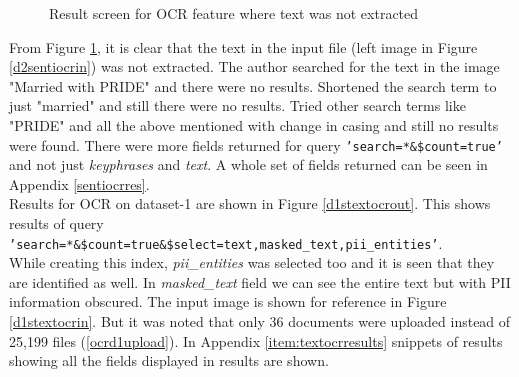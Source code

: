 \begin{itemize}
\begin {figure}[h!h]
        \caption{Result screen for \acs{OCR} feature where text was not extracted}
        \label{d2sentiocrout2}
    \end {figure}
   \newpage
   From Figure \ref{d2sentiocrout2}, it is clear that the text in the input file (left image in Figure \ref{d2sentiocrin}) was not extracted. The author searched for the text in the image "Married with PRIDE" and there were no results. Shortened the search term to just "married" and still there were no results. Tried other search terms like "PRIDE" and all the above mentioned with change in casing and still no results were found. There were more fields returned for query {\texttt{'search=*\&\$count=true'}}
   and not just \textit{keyphrases} and \textit{text}. A whole set of fields returned can be seen in Appendix \ref{sentiocrres}.\\
   Results for \acs{OCR} on dataset-1 are shown in Figure \ref{d1stextocrout}. This shows results of query\\ {\texttt{'search=*\&\$count=true\&\$select=text,masked\_text,pii\_entities'}}. \\ While creating this index, \textit{pii\_entities} was selected too and it is seen that they are identified as well. In \textit{masked\_text} field we can see the entire text but with \acs{PII} information obscured. The input image is shown for reference in Figure \ref{d1stextocrin}. But it was noted that only 36 documents were uploaded instead of 25,199 files (\ref{ocrd1upload}). In Appendix \ref{item:textocrresults} snippets of results showing all the fields displayed in results are shown.
   \begin {figure}[h!h]
        \centering

\end{figure}
\end{itemize}
